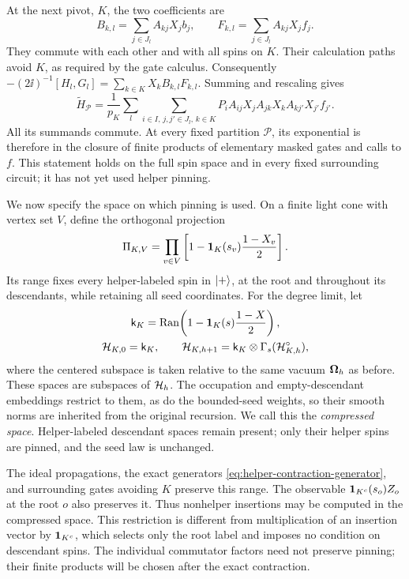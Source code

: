 At the next pivot, \(K\), the two coefficients are
\[
 B_{k,l}=\sum_{j\in J_l}A_{kj}X_jb_j,
 \qquad F_{k,l}=\sum_{j\in J_l}A_{kj}X_jf_j.
\]
They commute with each other and with all spins on \(K\).  Their
calculation paths avoid \(K\), as required by the gate calculus.
Consequently \(-(2\ii)^{-1}[H_l,G_l]
=\sum_{k\in K}X_k B_{k,l}F_{k,l}\).  Summing and rescaling gives
\begin{equation}
 \widetilde H_{\mathcal P}
  =\frac1{p_K}\sum_l\sum_{
       i\in I,\,j,j'\in J_l,\,k\in K}
       P_i A_{ij}X_j A_{jk}X_k A_{kj'}X_{j'}f_{j'}.
 \label{eq:helper-contraction-generator}
\end{equation}
All its summands commute.  At every fixed partition
\(\mathcal P\), its exponential is therefore in the closure of
finite products of elementary masked gates and calls to \(f\).
This statement holds on the full spin space and in every fixed
surrounding circuit; it has not yet used helper pinning.

We now specify the space on which pinning is used.  On a finite
light cone with vertex set \(V\), define the orthogonal projection
\begin{equation}
 \Pi_{K,V}=\prod_{v\in V}
       \left[1-\mathbf 1_K(s_v)\frac{1-X_v}{2}\right].
 \label{eq:helper-pinning-projection}
\end{equation}
Its range fixes every helper-labeled spin in \(\lvert +\rangle\), at the root
and throughout its descendants, while retaining all seed coordinates.
For the degree limit, let
\[
 \begin{gathered}
 \mathsf k_K=\operatorname{Ran}\!\left(1-\mathbf 1_K(s)\frac{1-X}{2}\right),\\
 \mathcal H_{K,0}=\mathsf k_K,\qquad
 \mathcal H_{K,h+1}=\mathsf k_K\otimes\Gamma_s(\mathcal H_{K,h}^{\circ}),
 \end{gathered}
\]
where the centered subspace is taken relative to the same vacuum
\(\boldsymbol\Omega_h\) as before.  These spaces are subspaces of \(\mathcal H_h\).
The occupation and empty-descendant embeddings restrict to them,
as do the bounded-seed weights, so their smooth norms are inherited
from the original recursion.  We call this the \emph{compressed space}.
Helper-labeled descendant spaces remain present; only their helper
spins are pinned, and the seed law is unchanged.

The ideal propagations, the exact generators
\eqref{eq:helper-contraction-generator}, and surrounding gates avoiding
\(K\) preserve this range.  The observable \(\mathbf 1_{K^c}(s_o)Z_o\)
at the root \(o\) also preserves it.  Thus nonhelper insertions may
be computed in the compressed space.  This restriction is different
from multiplication of an insertion vector by \(\mathbf 1_{K^c}\), which
selects only the root label and imposes no condition on descendant
spins.  The individual commutator factors need not preserve pinning;
their finite products will be chosen after the exact contraction.


